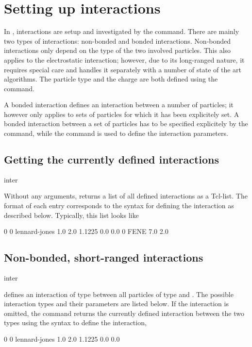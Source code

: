 \chapter{Setting up interactions}
\label{sec:inter}

In \es, interactions are setup and investigated by the 
command. There are mainly two types of interactions: non-bonded and
bonded interactions. Non-bonded interactions only depend on the type
of the two involved particles. This also applies to the electrostatic
interaction; however, due to its long-ranged nature, it requires
special care and \es handles it separately with a number of state of
the art algorithms. The particle type and the charge are both defined
using the  command.

A bonded interaction defines an interaction between a number of
particles; it however only applies to sets of particles for which it
has been explicitely set.  A bonded interaction between a set of
particles has to be specified explicitely by the 
command, while the  command is used to define the
interaction parameters.

\section{Getting the currently defined interactions}
\begin{essyntax}
  inter
\end{essyntax}

Without any arguments,  returns a list of all defined
interactions as a Tcl-list. The format of each entry corresponds to
the syntax for defining the interaction as described below. Typically,
this list looks like
\begin{tclcode}
  {0 0 lennard-jones 1.0 2.0 1.1225 0.0 0.0} {0 FENE 7.0 2.0}
\end{tclcode}

\section{Non-bonded, short-ranged interactions}
\label{sec:inter-nb}

\begin{essyntax*}
  inter  
\end{essyntax*}
defines an interaction of type  between all particles of type
 and . The possible interaction types and their parameters
are listed below. If the interaction is omitted, the command returns the
currently defined interaction between the two types using the syntax to define
the interaction, \eg
\begin{tclcode}
  0 0 lennard-jones 1.0 2.0 1.1225 0.0 0.0
\end{tclcode}

